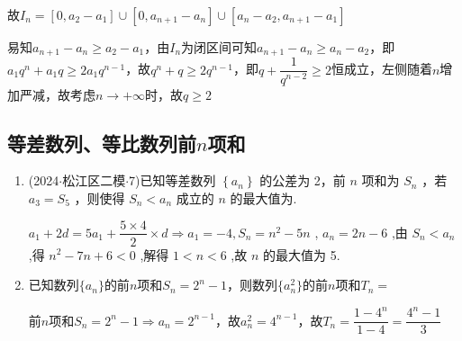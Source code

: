 \begin{enumerate}
\begin{jieda}
        故$I_n = [0, a_2-a_1] \cup [0, a_{n+1} - a_n] \cup [a_n-a_2, a_{n+1}-a_1]$

        易知$a_{n+1} - a_n \geq a_2-a_1$，由$I_n$为闭区间可知$a_{n+1} - a_n \geq a_n-a_2$，即$a_1q^n+a_1q \geq 2a_1q^{n-1}$，故$q^n+q \geq 2q^{n-1}$，即$q + \dfrac{1}{q^{n-2}} \geq 2$恒成立，左侧随着$n$增加严减，故考虑$n \rightarrow +\infty$时，故$q \geq 2$
    \end{jieda}
\end{enumerate}
\subsection*{等差数列、等比数列前$n$项和}
\begin{enumerate}
    \item (2024$\cdot$松江区二模$\cdot$7)已知等差数列 $\left\{  {a}_{n}\right\}$ 的公差为 2，前 $n$ 项和为 ${S}_{n}$ ，若 ${a}_{3} = {S}_{5}$ ，则使得 ${S}_{n} < {a}_{n}$ 成立的 $n$ 的最大值为.
    \begin{jieda}
        ${a}_{1} + {2d} = 5{a}_{1} + \dfrac{5 \times  4}{2} \times  d \Longrightarrow  {a}_{1} =  - 4,{S}_{n} = {n}^{2} - {5n}$ , ${a}_{n} = {2n} - 6$ ,由 ${S}_{n} < {a}_{n}$ ,得 ${n}^{2} - {7n} + 6 < 0$ ,解得 $1 < n < 6$ ,故 $n$ 的最大值为 5.
    \end{jieda}
    \item 已知数列$\{a_n\}$的前$n$项和$S_n = 2^n - 1$，则数列$\{a_n^2\}$的前$n$项和$T_n = $
    \begin{jieda}
        前$n$项和$S_n = 2^n - 1 \Longrightarrow a_n = 2^{n-1}$，故$a_n^2 = 4^{n-1}$，故$T_n = \dfrac{1-4^n}{1-4} = \dfrac{4^n - 1}{3}$
    \end{jieda}
\end{enumerate}
